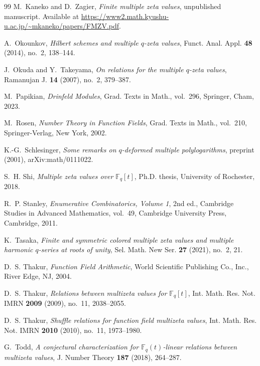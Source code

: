 \documentclass[12pt,reqno]{amsart}
\numberwithin{equation}{section}
\theoremstyle{plain}
\theoremstyle{definition}
\theoremstyle{remark}
\begin{document}
\begin{thebibliography}{99}
M.~Kaneko and D.~Zagier, \emph{Finite multiple zeta values}, unpublished manuscript. Available at \url{https://www2.math.kyushu-u.ac.jp/~mkaneko/papers/FMZV.pdf}.

A.~Okounkov, \emph{Hilbert schemes and multiple $q$-zeta values}, Funct. Anal. Appl. \textbf{48} (2014), no.~2, 138--144.

J.~Okuda and Y.~Takeyama, \emph{On relations for the multiple {$q$}-zeta values}, Ramanujan J. \textbf{14} (2007), no.~2, 379--387.

M.~Papikian, \emph{Drinfeld Modules}, Grad. Texts in Math., vol.~296, Springer, Cham, 2023.

M.~Rosen, \emph{Number Theory in Function Fields}, Grad. Texts in Math., vol.~210, Springer-Verlag, New York, 2002.

K.-G.~Schlesinger, \emph{Some remarks on $q$-deformed multiple polylogarithms}, preprint (2001), arXiv:math/0111022.

S.~H. Shi, \emph{Multiple zeta values over {$\mathbb{F}_q[t]$}}, Ph.D. thesis, University of Rochester, 2018.

R.~P. Stanley, \emph{Enumerative Combinatorics, Volume 1}, 2nd ed., Cambridge Studies in Advanced Mathematics, vol.~49, Cambridge University Press, Cambridge, 2011.

K.~Tasaka, \emph{Finite and symmetric colored multiple zeta values and multiple harmonic $q$-series at roots of unity}, Sel. Math. New Ser. \textbf{27} (2021), no.~2, 21.

D.~S. Thakur, \emph{Function Field Arithmetic}, World Scientific Publishing Co., Inc., River Edge, NJ, 2004.

D.~S. Thakur, \emph{Relations between multizeta values for {$\mathbb{F}_q[t]$}}, Int. Math. Res. Not. IMRN \textbf{2009} (2009), no.~11, 2038--2055.

D.~S. Thakur, \emph{Shuffle relations for function field multizeta values}, Int. Math. Res. Not. IMRN \textbf{2010} (2010), no.~11, 1973--1980.

G.~Todd, \emph{A conjectural characterization for {$\mathbb{F}_q(t)$}-linear relations between multizeta values}, J. Number Theory \textbf{187} (2018), 264--287.


\end{thebibliography}
\end{document}

